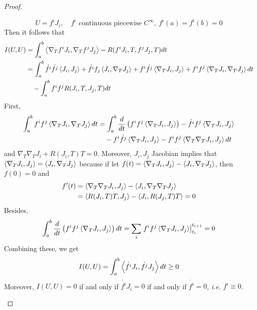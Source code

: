 \begin{enumerate}[label=\arabic{*}.]
\begin{proof}
\begin{enumerate}[label=(\arabic{*})]
\begin{equation*}
				U = f^iJ_i,\quad f^i \text{ continuous piecewise }C^\infty,~f^i(a)=f^i(b)=0
			\end{equation*}
			Then it follows that
			\begin{equation*}
				\begin{aligned}
					I(U,U) &= \int_a^b \left\langle \nabla_Tf^iJ_i,\nabla_Tf^jJ_j \right\rangle - R(f^iJ_i,T,f^jJ_j,T)dt\\
					&= \int_a^b \dot{f^i}\dot{f^j}\left\langle J_i,J_j \right\rangle+\dot{f^i}f_j\left\langle J_i,\nabla_TJ_j \right\rangle + {f^i}\dot{f^j}\left\langle \nabla_T J_i,J_j \right\rangle +{f^i}{f^j}\left\langle \nabla_TJ_i,\nabla_TJ_j \right\rangle dt\\
					&\quad - \int_a^b f^if^j R(J_i,T,J_j,T)dt
				\end{aligned}
			\end{equation*}
			First,
			\begin{equation*}
				\begin{aligned}
					\int_a^bf^if^j\left\langle \nabla_TJ_i,\nabla_TJ_j \right\rangle dt &= \int_a^b \frac{d}{dt}\left(f^if^j\left\langle \nabla_TJ_i,J_j \right\rangle\right) - \dot{f^i}f^j\left\langle \nabla_TJ_i,J_j \right\rangle \\
					&\quad  - f^i\dot{f^j}\left\langle \nabla_TJ_i,J_j \right\rangle - f^if^j\left\langle \nabla_T\nabla_TJ_i,J_j \right\rangle dt
				\end{aligned}
			\end{equation*}
			and $\nabla_T\nabla_TJ_i + R(J_i,T)T = 0$. Moreover, $J_i,J_j$ Jacobian implies that $\left\langle \nabla_T J_i,J_j \right\rangle = \left\langle J_i,\nabla_T J_j \right\rangle$ because if let $f(t) = \left\langle \nabla_T J_i,J_j \right\rangle - \left\langle J_i,\nabla_T J_j \right\rangle$, then $f(0) = 0$ and
			\begin{equation*}
				\begin{aligned}
					f^\prime(t) &= \left\langle \nabla_T\nabla_T J_i,J_j \right\rangle - \left\langle J_i,\nabla_T\nabla_T J_j \right\rangle \\ 
					&=  \left\langle R(J_i,T)T,J_j \right\rangle - \left\langle J_i,R(J_j,T)T \right\rangle = 0
				\end{aligned}
			\end{equation*}
			Besides,
			\begin{equation*}
				\int_a^b \frac{d}{dt}\left(f^if^j\left\langle \nabla_TJ_i,J_j \right\rangle\right)dt = \sum_i\left.f^if^j\left\langle \nabla_TJ_i,J_j \right\rangle\right\lvert_{t_i}^{t_{i+1}} = 0
			\end{equation*}
			Combining these, we get
			\begin{equation*}
				I(U,U) = \int_a^b \left\langle \dot{f^i}J_i,\dot{f^j}J_j \right\rangle dt \geq 0
			\end{equation*}
			Moreover, $I(U,U) = 0$ if and only if $\dot{f^i}J_i = 0$ if and only if $\dot{f^i} = 0$, \emph{i.e.} $f^i \equiv 0$.


\end{enumerate}
\end{proof}
\end{enumerate}

